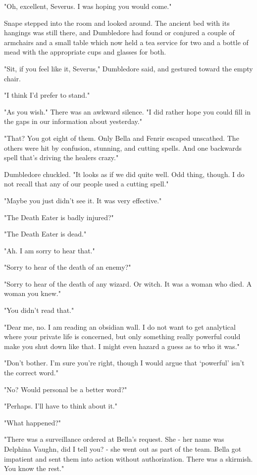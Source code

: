 "Oh, excellent, Severus. I was hoping you would come."

Snape stepped into the room and looked around. The ancient bed with its hangings was still there, and Dumbledore had found or conjured a couple of armchairs and a small table which now held a tea service for two and a bottle of mead with the appropriate cups and glasses for both.

"Sit, if you feel like it, Severus," Dumbledore said, and gestured toward the empty chair.

"I think I'd prefer to stand."

"As you wish." There was an awkward silence. "I did rather hope you could fill in the gaps in our information about yesterday."

"That? You got eight of them. Only Bella and Fenrir escaped unscathed. The others were hit by confusion, stunning, and cutting spells. And one backwards spell that's driving the healers crazy."

Dumbledore chuckled. "It looks as if we did quite well. Odd thing, though. I do not recall that any of our people used a cutting spell."

"Maybe you just didn't see it. It was very effective."

"The Death Eater is badly injured?"

"The Death Eater is dead."

"Ah. I am sorry to hear that."

"Sorry to hear of the death of an enemy?"

"Sorry to hear of the death of any wizard. Or witch. It was a woman who died. A woman you knew."

"You didn't read that."

"Dear me, no. I am reading an obsidian wall. I do not want to get analytical where your private life is concerned, but only something really powerful could make you shut down like that. I might even hazard a guess as to who it was."

"Don't bother. I'm sure you're right, though I would argue that `powerful' isn't the correct word."

"No? Would personal be a better word?"

"Perhaps. I'll have to think about it."

"What happened?"

"There was a surveillance ordered at Bella's request. She - her name was Delphina Vaughn, did I tell you? - she went out as part of the team. Bella got impatient and sent them into action without authorization. There was a skirmish. You know the rest."

